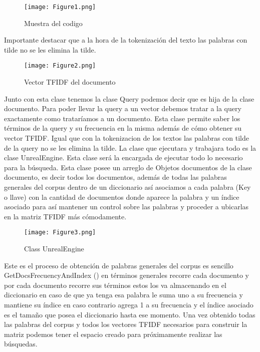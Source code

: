 \documentclass[a4paper,12pt]{article}
\begin{document}
\begin{figure}[h]
    \center
    \texttt{[image: Figure1.png]}
    \caption{Muestra del codigo}
    \label{fig:logo}
\end{figure}

Importante destacar que a la hora de la tokenización del texto las palabras con tilde no se les elimina la tilde.

\begin{figure}[h]
    \center
    \texttt{[image: Figure2.png]}
    \caption{Vector TFIDF del documento}
    \label{fig:logo}
\end{figure}

Junto con esta clase tenemos la clase Query podemos decir que es hija de la clase documento. Para poder llevar la query a un vector debemos tratar a la query exactamente como trataríamos a un documento. Esta clase permite saber los términos de la query y su frecuencia en la misma además de cómo obtener su vector TFIDF. Igual que con la tokenizacion de los textos las palabras con tilde de la query no se les elimina la tilde.
La clase que ejecutara y trabajara todo es la clase UnrealEngine. Esta clase será la encargada de ejecutar todo lo necesario para la búsqueda. Esta clase posee un arreglo de Objetos documentos de la clase documento, es decir todos los documentos, además de todas las palabras generales del corpus dentro de un diccionario así asociamos a cada palabra (Key o llave) con la cantidad de documentos donde aparece la palabra  y un índice asociado para así mantener un control sobre las palabras y proceder a ubicarlas en la matriz TFIDF más cómodamente. 

\begin{figure}[h]
    \center
    \texttt{[image: Figure3.png]}
    \caption{Class UnrealEngine}
    \label{fig:logo}
\end{figure}

Este es el proceso de obtención de palabras generales del corpus es sencillo  GetDocsFrecuencyAndIndex () en términos generales recorre cada documento y por cada documento recorre sus términos estos los va almacenando en el diccionario en caso de que ya tenga esa palabra le suma uno a su frecuencia y mantiene su índice en caso contrario agrega 1 a su frecuencia y el índice asociado es el tamaño que posea el diccionario hasta ese momento.
Una vez obtenido todas las palabras del corpus y todos los vectores TFIDF necesarios para construir la matriz podemos tener el espacio creado para próximamente realizar las búsquedas.
\end{document}
